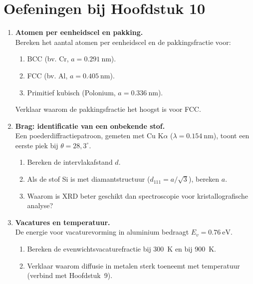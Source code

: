 
\section*{Oefeningen bij Hoofdstuk 10}

\begin{enumerate}

\item \textbf{Atomen per eenheidscel en pakking.} \\
Bereken het aantal atomen per eenheidscel en de pakkingsfractie voor:
\begin{enumerate}
\item[(a)] BCC (bv. Cr, $a = \SI{0.291}{\nano\metre}$).
\item[(b)] FCC (bv. Al, $a = \SI{0.405}{\nano\metre}$).
\item[(c)] Primitief kubisch (Polonium, $a = \SI{0.336}{\nano\metre}$).
\end{enumerate}
Verklaar waarom de pakkingsfractie het hoogst is voor FCC.

\item \textbf{Brag: identificatie van een onbekende stof.} \\
Een poederdiffractiepatroon, gemeten met Cu K$\alpha$ ($\lambda = \SI{0.154}{\nano\metre}$), toont een eerste piek bij $\theta = 28{,}3^\circ$.
\begin{enumerate}
\item[(a)] Bereken de intervlakafstand $d$.
\item[(b)] Als de stof Si is met diamantstructuur ($d_{111} = a/\sqrt{3}$), bereken $a$.
\item[(c)] Waarom is XRD beter geschikt dan spectroscopie voor kristallografische analyse?
\end{enumerate}

\item \textbf{Vacatures en temperatuur.} \\
De energie voor vacaturevorming in aluminium bedraagt $E_v = \SI{0.76}{\electronvolt}$.
\begin{enumerate}
\item[(a)] Bereken de evenwichtsvacaturefractie bij \SI{300}{\kelvin} en bij \SI{900}{\kelvin}.
\item[(b)] Verklaar waarom diffusie in metalen sterk toeneemt met temperatuur (verbind met Hoofdstuk~9).
\end{enumerate}


\end{enumerate}
